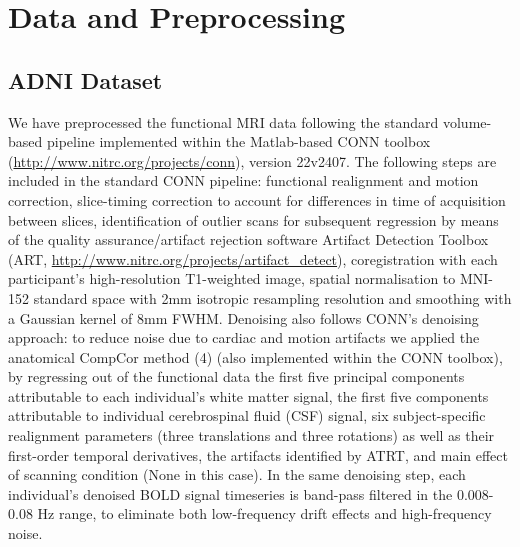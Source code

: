 \section{Data and Preprocessing}
\subsection{ADNI Dataset}


We have preprocessed the functional MRI data following the standard volume-based pipeline implemented within the Matlab-based CONN toolbox (\url{http://www.nitrc.org/projects/conn}), version 22v2407. The following steps are included in the standard CONN pipeline: functional realignment and motion correction, slice-timing correction to account for differences in time of acquisition between slices, identification of outlier scans for subsequent regression by means of the quality assurance/artifact rejection software Artifact Detection Toolbox (ART, \url{http://www.nitrc.org/projects/artifact_detect}), coregistration with each participant's high-resolution T1-weighted image, spatial normalisation to MNI-152 standard space with 2mm isotropic resampling resolution and smoothing with a Gaussian kernel of 8mm FWHM.
Denoising also follows CONN's denoising approach: to reduce noise due to cardiac and motion artifacts we applied the anatomical CompCor method (4) (also implemented within the CONN toolbox), by regressing out of the functional data the first five principal components attributable to each individual's white matter signal, the first five components attributable to individual cerebrospinal fluid (CSF) signal, six subject-specific realignment parameters (three translations and three rotations) as well as their first-order temporal derivatives, the artifacts identified by ATRT, and main effect of scanning condition (None in this case). In the same denoising step, each individual's denoised BOLD signal timeseries is band-pass filtered in the 0.008-0.08 Hz range, to eliminate both low-frequency drift effects and high-frequency noise.


